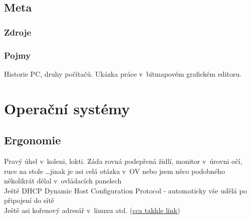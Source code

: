 \documentclass[12pt]{article}
\begin{document}
\subsection{Meta}
\subsubsection{Zdroje}
\subsubsection{Pojmy}
Historie PC, druhy počítačů. Ukázka práce v~bitmapovém grafickém editoru.

\section{Operační systémy}
\subsection{Ergonomie}
Pravý úhel v~koleni, lokti. Záda rovná podepřená židlí, monitor v~úrovni očí, ruce na stole \dots jinak je asi celá otázka v~OV nebo jsem něco podobného několikrát dělal v~ovládacích panelech\\
Ještě DHCP Dynamic Host Configuration Protocol - automaticky vše udělá po připojení do sítě\\
Ještě asi kořenový adresář v~linuxu atd. (\href{https://www.howtogeek.com/117435/htg-explains-the-linux-directory-structure-explained/}{cca takhle link})
\end{document}
